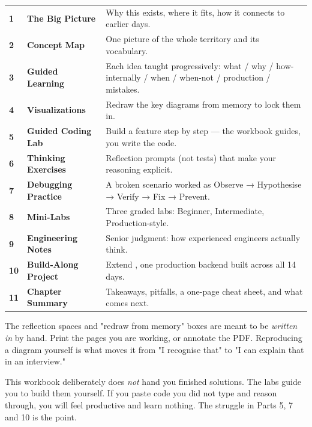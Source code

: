 \begin{center}\small
\begin{tabularx}{\linewidth}{@{}p{4mm}L{36mm}X@{}}
\textbf{1} & \textbf{The Big Picture} & Why this exists, where it fits, how it connects to earlier days.\\[1.2mm]
\textbf{2} & \textbf{Concept Map} & One picture of the whole territory and its vocabulary.\\[1.2mm]
\textbf{3} & \textbf{Guided Learning} & Each idea taught progressively: what / why / how-internally / when / when-not / production / mistakes.\\[1.2mm]
\textbf{4} & \textbf{Visualizations} & Redraw the key diagrams from memory to lock them in.\\[1.2mm]
\textbf{5} & \textbf{Guided Coding Lab} & Build a feature step by step — the workbook guides, you write the code.\\[1.2mm]
\textbf{6} & \textbf{Thinking Exercises} & Reflection prompts (not tests) that make your reasoning explicit.\\[1.2mm]
\textbf{7} & \textbf{Debugging Practice} & A broken scenario worked as Observe → Hypothesise → Verify → Fix → Prevent.\\[1.2mm]
\textbf{8} & \textbf{Mini-Labs} & Three graded labs: Beginner, Intermediate, Production-style.\\[1.2mm]
\textbf{9} & \textbf{Engineering Notes} & Senior judgment: how experienced engineers actually think.\\[1.2mm]
\textbf{10} & \textbf{Build-Along Project} & Extend , one production backend built across all 14 days.\\[1.2mm]
\textbf{11} & \textbf{Chapter Summary} & Takeaways, pitfalls, a one-page cheat sheet, and what comes next.\\
\end{tabularx}
\end{center}

\begin{prodtip}
The reflection spaces and "redraw from memory" boxes are meant to be \emph{written in} by hand. Print
the pages you are working, or annotate the PDF. Reproducing a diagram yourself is what moves it from
"I recognise that" to "I can explain that in an interview."
\end{prodtip}

\begin{secwarn}
This workbook deliberately does \emph{not} hand you finished solutions. The labs guide you to build them
yourself. If you paste code you did not type and reason through, you will feel productive and learn nothing.
The struggle in Parts 5, 7 and 10 is the point.
\end{secwarn}

